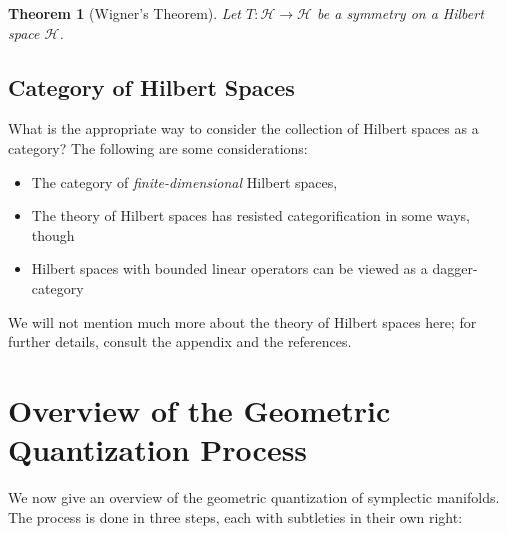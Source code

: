 \documentclass{tufte-handout}
\newtheorem{thrm}{Theorem}
\begin{document}
\begin{thrm}[Wigner's Theorem]
Let $T: \mathcal{H} \to \mathcal{H}$ be a symmetry on a Hilbert space $\mathcal{H}$.
\end{thrm}

\subsection{Category of Hilbert Spaces}
What is the appropriate way to consider the collection of Hilbert spaces as a category? The following are some considerations:

\begin{itemize}
\item The category of \emph{finite-dimensional} Hilbert spaces, %

\item The theory of Hilbert spaces has resisted categorification in some ways, though %

\item Hilbert spaces with bounded linear operators can be viewed as a dagger-category %
\end{itemize}

We will not mention much more about the theory of Hilbert spaces here; for further details, consult the appendix and the references.


\section{Overview of the Geometric Quantization Process}
We now give an overview of the geometric quantization of symplectic manifolds. The process is done in three steps, each with subtleties in their own right:
\end{document}
